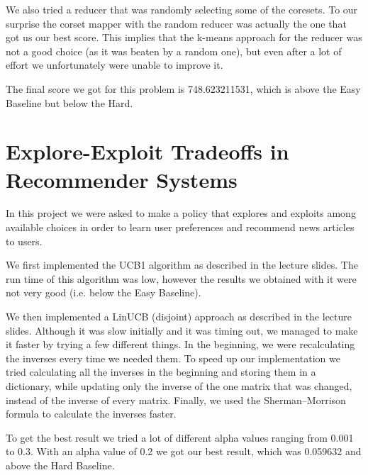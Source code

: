 \documentclass[a4paper, 11pt]{article}
\begin{document}
We also tried a reducer that was randomly selecting some of the coresets. To our surprise the corset mapper with the random reducer was actually the one that got us our best score. This implies that the k-means approach for the reducer was not a good choice (as it was beaten by a random one), but even after a lot of effort we unfortunately were unable to improve it.

The final score we got for this problem is 748.623211531, which is above the Easy Baseline but below the Hard.

\newpage

\section*{Explore-Exploit Tradeoffs in Recommender Systems}
In this project we were asked to make a policy that explores and exploits among available choices in order to learn user preferences and recommend news articles to users.

We first implemented the UCB1 algorithm as described in the lecture slides. The run time of this algorithm was low, however the results we obtained with it were not very good (i.e. below the Easy Baseline).

We then implemented a LinUCB (disjoint) approach as described in the lecture slides. Although it was slow initially and it was timing out, we managed to make it faster by trying a few different things. In the beginning, we were recalculating the inverses every time we needed them.  To speed up our implementation we tried calculating all the inverses in the beginning and storing them in a dictionary, while updating only the inverse of the one matrix that was changed, instead of the inverse of every matrix. Finally, we used the Sherman–Morrison formula to calculate the inverses faster.

To get the best result we tried a lot of different alpha values ranging from 0.001 to 0.3. With an alpha value of 0.2 we got our best result, which was 0.059632 and above the Hard Baseline.
\end{document}
